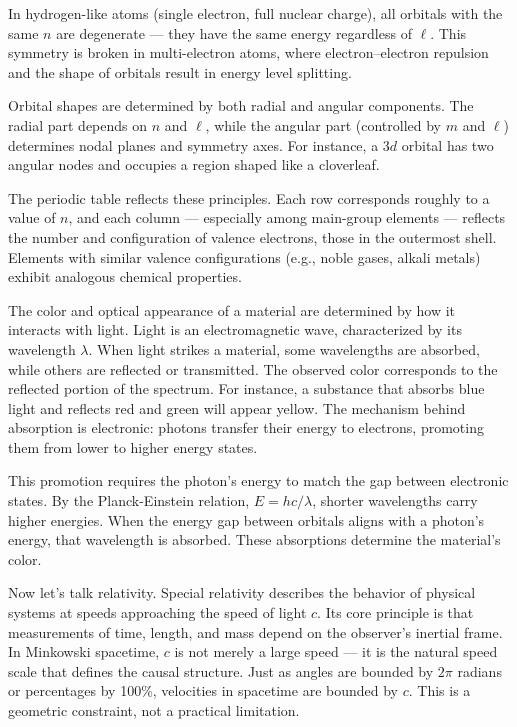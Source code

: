 In hydrogen-like atoms (single electron, full nuclear charge), all orbitals with the same $n$ are degenerate — they have the same energy regardless of $\ell$. This symmetry is broken in multi-electron atoms, where electron–electron repulsion and the shape of orbitals result in energy level splitting.

Orbital shapes are determined by both radial and angular components. The radial part depends on $n$ and $\ell$, while the angular part (controlled by $m$ and $\ell$) determines nodal planes and symmetry axes. For instance, a $3d$ orbital has two angular nodes and occupies a region shaped like a cloverleaf.


The periodic table reflects these principles. Each row corresponds roughly to a value of $n$, and each column — especially among main-group elements — reflects the number and configuration of valence electrons, those in the outermost shell. Elements with similar valence configurations (e.g., noble gases, alkali metals) exhibit analogous chemical properties.


The color and optical appearance of a material are determined by how it interacts with light. Light is an electromagnetic wave, characterized by its wavelength \( \lambda \). When light strikes a material, some wavelengths are absorbed, while others are reflected or transmitted. The observed color corresponds to the reflected portion of the spectrum. For instance, a substance that absorbs blue light and reflects red and green will appear yellow. The mechanism behind absorption is electronic: photons transfer their energy to electrons, promoting them from lower to higher energy states.

This promotion requires the photon's energy to match the gap between electronic states. By the Planck-Einstein relation, $E = hc/\lambda$, shorter wavelengths carry higher energies. When the energy gap between orbitals aligns with a photon's energy, that wavelength is absorbed. These absorptions determine the material's color.

Now let's talk relativity. Special relativity describes the behavior of physical systems at speeds approaching the speed of light \( c \). Its core principle is that measurements of time, length, and mass depend on the observer's inertial frame. In Minkowski spacetime, \( c \) is not merely a large speed — it is the natural speed scale that defines the causal structure. Just as angles are bounded by \( 2\pi \) radians or percentages by 100\%, velocities in spacetime are bounded by \( c \). This is a geometric constraint, not a practical limitation.

